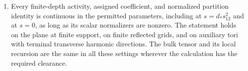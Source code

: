 \begin{proposition}
\begin{enumerate}[label=\textup{(\roman*)}]
sources, the lower bound on $b$ is independent of their number; only the
boundedly many late numerical event costs may depend on the fixed source
configuration. If $T_\Lambda$ is an admissible early transport of an
untagged representation, then for any $A_U\ge A_D>0$, before support relocation
\[
 \mathsf s_X(T_\Lambda\mathcal R)=\mathsf s_X(\mathcal R),\qquad
 A_D^{|X|}\mathsf s_X(T_\Lambda\mathcal R)
 \le (A_D/A_U)^{|X|}\|\mathcal R\|_{A_U}.
\]
The transport leaves every opaque completed coefficient occurrence
unchanged and is not defined on an already tagged live root.
\item Every finite-depth activity, assigned coefficient, and normalized
partition identity is continuous in the permitted parameters, including
at $s=d_*s_{12}^2$ and at $s=0$, as long as its scalar normalizers are
nonzero. The statement holds on the plane at finite support, on finite
reflected grids, and on auxiliary tori with terminal transverse harmonic
directions. The bulk tensor and its local recursion are the same in all
these settings wherever the calculation has the required clearance.
\end{enumerate}
\end{proposition}
